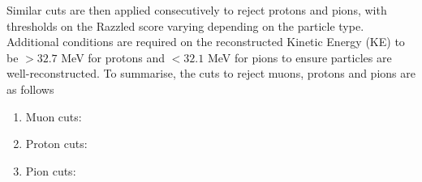 Similar cuts are then applied consecutively to reject protons and pions, with thresholds on the Razzled score varying depending on the particle type.
Additional conditions are required on the reconstructed Kinetic Energy (KE) to be $ > 32.7$ MeV for protons and $< 32.1$ MeV for pions to ensure particles are well-reconstructed. 
To summarise, the cuts to reject muons, protons and pions are as follows
\begin{enumerate}
\item Muon cuts:
\item Proton cuts:
\item Pion cuts:
\end{enumerate}
